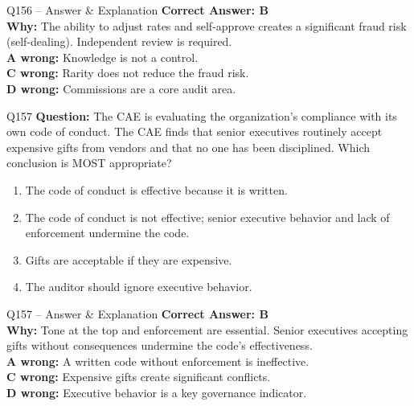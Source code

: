 \documentclass[aspectratio=169,10pt]{beamer}
\begin{document}
	\begin{frame}[t]{Q156 -- Answer \& Explanation}
		\small
		\textbf{Correct Answer: B} \\[4pt]
		\textbf{Why:} The ability to adjust rates and self-approve creates a significant fraud risk (self-dealing). Independent review is required. \\[4pt]
		\textbf{A wrong:} Knowledge is not a control. \\[2pt]
		\textbf{C wrong:} Rarity does not reduce the fraud risk. \\[2pt]
		\textbf{D wrong:} Commissions are a core audit area.
	\end{frame}
	
	\begin{frame}[t]{Q157}
		\small
		\textbf{Question:} The CAE is evaluating the organization's compliance with its own code of conduct. The CAE finds that senior executives routinely accept expensive gifts from vendors and that no one has been disciplined. Which conclusion is MOST appropriate?
		\begin{enumerate}[label=\Alph*.,itemsep=1pt,topsep=2pt]
			\item The code of conduct is effective because it is written.
			\item The code of conduct is not effective; senior executive behavior and lack of enforcement undermine the code.
			\item Gifts are acceptable if they are expensive.
			\item The auditor should ignore executive behavior.
		\end{enumerate}
	\end{frame}
	
	\begin{frame}[t]{Q157 -- Answer \& Explanation}
		\small
		\textbf{Correct Answer: B} \\[4pt]
		\textbf{Why:} Tone at the top and enforcement are essential. Senior executives accepting gifts without consequences undermine the code's effectiveness. \\[4pt]
		\textbf{A wrong:} A written code without enforcement is ineffective. \\[2pt]
		\textbf{C wrong:} Expensive gifts create significant conflicts. \\[2pt]
		\textbf{D wrong:} Executive behavior is a key governance indicator.
	\end{frame}
	
\end{document}
